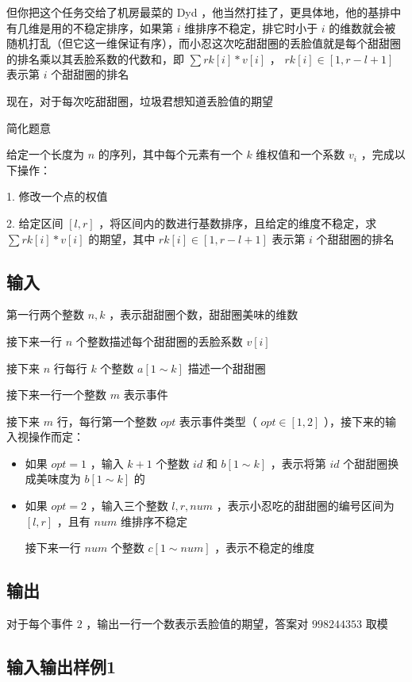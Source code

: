 \documentclass[UTF8]{ctexart}
\begin{document}
但你把这个任务交给了机房最菜的 Dyd ，他当然打挂了，更具体地，他的基排中有几维是用的不稳定排序，如果第 $i$ 维排序不稳定，排它时小于 $i$ 的维数就会被随机打乱（但它这一维保证有序），而小忍这次吃甜甜圈的丢脸值就是每个甜甜圈的排名乘以其丢脸系数的代数和，即 $\sum rk[i] * v[i]$  ， $rk[i] \in [1, r - l + 1]$ 表示第 $i$ 个甜甜圈的排名

现在，对于每次吃甜甜圈，垃圾君想知道丢脸值的期望

\vspace{5mm}
简化题意

给定一个长度为 $n$ 的序列，其中每个元素有一个 $k$ 维权值和一个系数 $v_i$ ，完成以下操作：

1. 修改一个点的权值

2. 给定区间 $[l, r]$ ，将区间内的数进行基数排序，且给定的维度不稳定，求 $\sum rk[i] * v[i]$ 的期望，其中 $rk[i] \in [1, r - l + 1]$ 表示第 $i$ 个甜甜圈的排名

\subsection{输入}
第一行两个整数 $n, k$ ，表示甜甜圈个数，甜甜圈美味的维数

接下来一行 $n$ 个整数描述每个甜甜圈的丢脸系数 $v[i]$ 

接下来 $n$ 行每行 $k$ 个整数 $a[1 \sim k]$ 描述一个甜甜圈

接下来一行一个整数 $m$ 表示事件

接下来 $m$ 行，每行第一个整数 $opt$ 表示事件类型（ $opt \in [1, 2]$ ），接下来的输入视操作而定：

\begin{itemize}
    \item 如果 $opt = 1$ ，输入 $k + 1$ 个整数 $id$ 和 $b[1 \sim k]$ ，表示将第 $id$ 个甜甜圈换成美味度为 $b[1 \sim k]$ 的 
    \item 如果 $opt = 2$ ，输入三个整数 $l, r, num$ ，表示小忍吃的甜甜圈的编号区间为 $[l, r]$ ，且有 $num$ 维排序不稳定

    接下来一行 $num$ 个整数 $c[1 \sim num]$ ，表示不稳定的维度 
\end{itemize}

\subsection{输出}

对于每个事件 $2$ ，输出一行一个数表示丢脸值的期望，答案对 $998244353$ 取模

\subsection{输入输出样例1}
\end{document}
